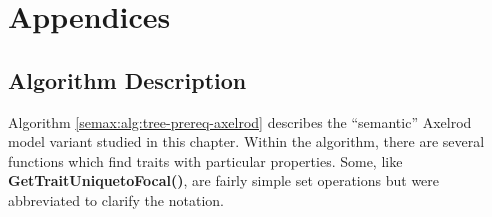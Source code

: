 \clearpage

\section{Appendices}\label{semax:sec:appendices}

\subsection{Algorithm Description}\label{semax:sec:algorithm-description}

Algorithm \ref{semax:alg:tree-prereq-axelrod} describes the ``semantic''
Axelrod model variant studied in this chapter. Within the algorithm,
there are several functions which find traits with particular
properties. Some, like \textbf{GetTraitUniquetoFocal()}, are fairly
simple set operations but were abbreviated to clarify the notation.

